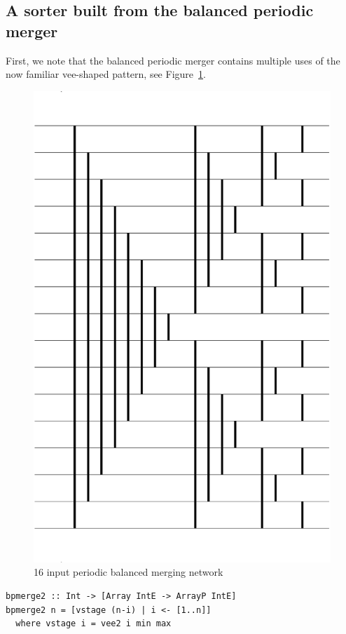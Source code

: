 \documentclass[]{sigplanconf}
\begin{document}
\subsection{A sorter built from the balanced periodic merger}
First, we note that the balanced periodic merger contains multiple
uses of the now familiar vee-shaped pattern, see Figure~\ref{fig:periodicMerger}.
\begin{figure}
\centering
\includegraphics[scale=0.25]{balanced}
\caption{16 input periodic balanced merging network}
\label{fig:periodicMerger}
\end{figure}

\begin{codesize}
\begin{verbatim}
bpmerge2 :: Int -> [Array IntE -> ArrayP IntE]
bpmerge2 n = [vstage (n-i) | i <- [1..n]]
  where vstage i = vee2 i min max
\end{verbatim}
\end{codesize}
\end{document}
